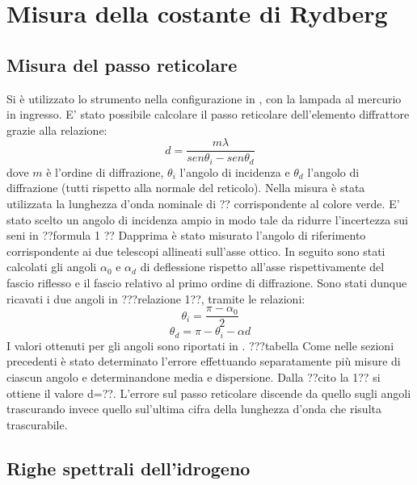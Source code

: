 \section{Misura della costante di Rydberg}

\subsection{Misura del passo reticolare}
Si è utilizzato lo strumento nella configurazione in , con la lampada al mercurio in ingresso. E' stato possibile calcolare il passo reticolare dell'elemento diffrattore grazie alla relazione:
\begin{equation}
d = \frac{m\lambda}{sen\theta_{i} - sen\theta_{d}}
\label{legge_diffrazione}
\end{equation} dove $m$ è l'ordine di diffrazione, $\theta_{i}$ l'angolo di incidenza e $\theta_{d}$ l'angolo di diffrazione (tutti rispetto alla normale del reticolo). Nella misura è stata utilizzata la lunghezza d'onda nominale di ?? corrispondente al colore verde. E' stato scelto un angolo di incidenza ampio in modo tale da ridurre l'incertezza sui seni in ??formula 1 ??\newline
Dapprima è stato misurato l'angolo di riferimento corrispondente ai due telescopi allineati sull'asse ottico. In seguito sono stati calcolati gli angoli $\alpha_{0}$ e $\alpha_{d}$ di deflessione rispetto all'asse rispettivamente del fascio riflesso e il fascio relativo al primo ordine di diffrazione. Sono stati dunque ricavati i due angoli in ???relazione 1??, tramite le relazioni:
\begin{equation}
\theta_{i}=\frac{\pi-\alpha_{0}}{2}
\end{equation}
\begin{equation}
 \theta_{d}=\pi-\theta_{i}-\alpha{d}
\end{equation}
I valori ottenuti per gli angoli sono riportati in .
???tabella
Come nelle sezioni precedenti è stato determinato l'errore effettuando separatamente più misure di ciascun angolo e determinandone media e dispersione.
\newline
Dalla ??cito la 1?? si ottiene il valore  d=??. L'errore sul passo reticolare discende da quello sugli angoli trascurando invece quello sul'ultima cifra della lunghezza d'onda che risulta trascurabile.

\subsection{Righe spettrali dell'idrogeno}

